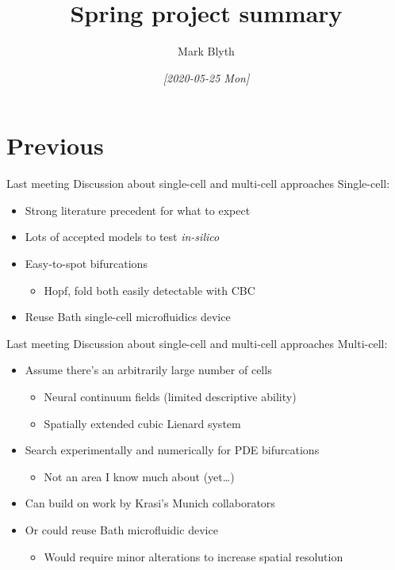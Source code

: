 \documentclass[presentation]{beamer}
\author{Mark Blyth}
\date{\textit{[2020-05-25 Mon]}}
\title{Spring project summary}
\begin{document}
\maketitle

\section{Previous}
\label{sec:orgf89715d}
\begin{frame}[label={sec:orga023713}]{Last meeting}
Discussion about single-cell and multi-cell approaches
\vfill
Single-cell: 
\begin{itemize}[<+->]
\item Strong literature precedent for what to expect
\item Lots of accepted models to test \emph{in-silico}
\item Easy-to-spot bifurcations
\begin{itemize}
\item Hopf, fold both easily detectable with CBC
\end{itemize}
\item Reuse Bath single-cell microfluidics device
\end{itemize}
\end{frame}


\begin{frame}[label={sec:orgbf79652}]{Last meeting}
Discussion about single-cell and multi-cell approaches
\vfill
Multi-cell: 
\begin{itemize}[<+->]
\item Assume there's an arbitrarily large number of cells
\begin{itemize}
\item Neural continuum fields (limited descriptive ability)
\item Spatially extended cubic Lienard system
\end{itemize}
\item Search experimentally and numerically for PDE bifurcations
\begin{itemize}
\item Not an area I know much about (yet\ldots{})
\end{itemize}
\item Can build on work by Krasi's Munich collaborators
\item Or could reuse Bath microfluidic device
\begin{itemize}
\item Would require minor alterations to increase spatial resolution
\end{itemize}
\end{itemize}
\end{frame}
\end{document}
